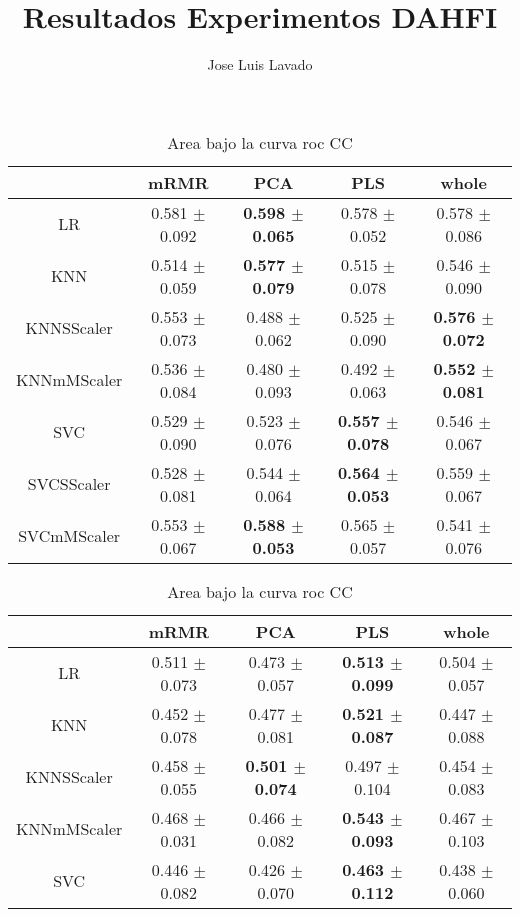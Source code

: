 \documentclass[]{report}
\title{Resultados Experimentos DAHFI}
\author{Jose Luis Lavado}
\begin{document}
\maketitle

	\begin{table}
		\centering
		\setlength{\aboverulesep}{0pt}
		\setlength{\belowrulesep}{0pt}
		\begin{tabular}{c|cccc}
			\hline
			             & mRMR            & PCA             & PLS             & whole           \\
			\hline
			 LR          & 0.581 $\pm$ 0.092 & \textbf{0.598 $\pm$ 0.065} & 0.578 $\pm$ 0.052 & 0.578 $\pm$ 0.086 \\
			 KNN         & 0.514 $\pm$ 0.059 & \textbf{0.577 $\pm$ 0.079} & 0.515 $\pm$ 0.078 & 0.546 $\pm$ 0.090 \\
			 KNNSScaler  & 0.553 $\pm$ 0.073 & 0.488 $\pm$ 0.062 & 0.525 $\pm$ 0.090 & \textbf{0.576 $\pm$ 0.072} \\
			 KNNmMScaler & 0.536 $\pm$ 0.084 & 0.480 $\pm$ 0.093 & 0.492 $\pm$ 0.063 & \textbf{0.552 $\pm$ 0.081} \\
			 SVC         & 0.529 $\pm$ 0.090 & 0.523 $\pm$ 0.076 & \textbf{0.557 $\pm$ 0.078} & 0.546 $\pm$ 0.067 \\
			 SVCSScaler  & 0.528 $\pm$ 0.081 & 0.544 $\pm$ 0.064 & \textbf{0.564 $\pm$ 0.053} & 0.559 $\pm$ 0.067 \\
			 SVCmMScaler & 0.553 $\pm$ 0.067 & \textbf{0.588 $\pm$ 0.053} & 0.565 $\pm$ 0.057 & 0.541 $\pm$ 0.076 \\
			\hline
		\end{tabular}
		\caption{\label{tab:auc_score_CC} Area bajo la curva roc CC}
		\vspace*{2cm}
		\begin{tabular}{c|cccc}
			\hline
			             & mRMR            & PCA             & PLS             & whole           \\
			\hline
			 LR          & 0.511 $\pm$ 0.073 & 0.473 $\pm$ 0.057 & \textbf{0.513 $\pm$ 0.099} & 0.504 $\pm$ 0.057 \\
			 KNN         & 0.452 $\pm$ 0.078 & 0.477 $\pm$ 0.081 & \textbf{0.521 $\pm$ 0.087} & 0.447 $\pm$ 0.088 \\
			 KNNSScaler  & 0.458 $\pm$ 0.055 & \textbf{0.501 $\pm$ 0.074} & 0.497 $\pm$ 0.104 & 0.454 $\pm$ 0.083 \\
			 KNNmMScaler & 0.468 $\pm$ 0.031 & 0.466 $\pm$ 0.082 & \textbf{0.543 $\pm$ 0.093} & 0.467 $\pm$ 0.103 \\
			 SVC         & 0.446 $\pm$ 0.082 & 0.426 $\pm$ 0.070 & \textbf{0.463 $\pm$ 0.112} & 0.438 $\pm$ 0.060 \\

\end{tabular}
\end{table}
\end{document}
